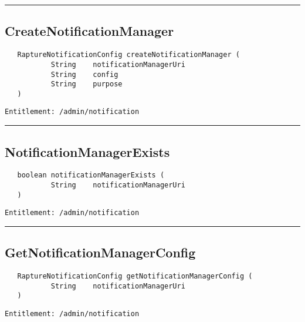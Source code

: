\rule{12cm}{2pt}
\subsection{CreateNotificationManager}
\label{Api:CreateNotificationManager}
\begin{verbatim}
   RaptureNotificationConfig createNotificationManager (
           String    notificationManagerUri
           String    config
           String    purpose
   )
\end{verbatim}
\begin{Verbatim}[fontsize=\small, formatcom=\color{Maroon}]
  Entitlement: /admin/notification
\end{Verbatim}



\rule{12cm}{2pt}
\subsection{NotificationManagerExists}
\label{Api:NotificationManagerExists}
\begin{verbatim}
   boolean notificationManagerExists (
           String    notificationManagerUri
   )
\end{verbatim}
\begin{Verbatim}[fontsize=\small, formatcom=\color{Maroon}]
  Entitlement: /admin/notification
\end{Verbatim}



\rule{12cm}{2pt}
\subsection{GetNotificationManagerConfig}
\label{Api:GetNotificationManagerConfig}
\begin{verbatim}
   RaptureNotificationConfig getNotificationManagerConfig (
           String    notificationManagerUri
   )
\end{verbatim}
\begin{Verbatim}[fontsize=\small, formatcom=\color{Maroon}]
  Entitlement: /admin/notification
\end{Verbatim}



